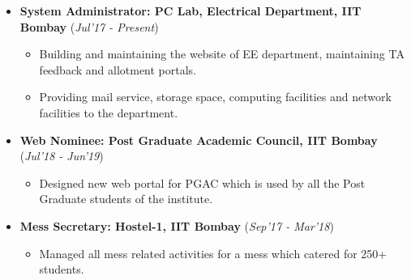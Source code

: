 \documentclass[10pt]{article}
\begin{document}
\begin{itemize}[leftmargin=0.4cm]
\vspace{-0.2cm}
\item \textbf {System Administrator: PC Lab, Electrical Department, IIT Bombay} 
\hfill{(\textit{Jul'17 - Present})}\\[-0.6cm]
    \begin{itemize}
	\item Building and maintaining the website of EE department, maintaining TA feedback and allotment portals.\vspace{-0.1cm}
	\item Providing mail service, storage space, computing facilities and network facilities to the department.\vspace{-0.1cm}

	\end{itemize}
	\vspace{-0.25cm}
	
	
\item \textbf{Web Nominee: Post Graduate Academic Council, IIT Bombay}
\hfill{(\textit{Jul'18 - Jun'19})}\\[-0.65cm]
    \begin{itemize}
			\item Designed new web portal for PGAC which is used by all the Post Graduate students of the institute. \vspace{-0.1cm}
		
		\end{itemize}
		\vspace{-0.25cm}

\item \textbf{Mess Secretary: Hostel-1, IIT Bombay}
\hfill{(\textit{Sep'17 - Mar'18})}\\[-0.65cm]
    \begin{itemize}
            \item Managed all mess related activities for a mess which catered for 250+ students. \vspace{-0.1cm}

		\end{itemize}
		\vspace{-0.2cm}	
   	
\end{itemize}
\vspace{0.05cm}
\end{document}
